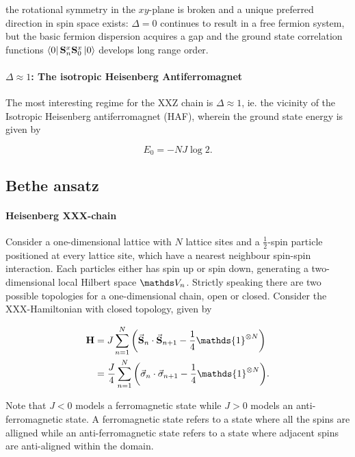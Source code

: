 \documentclass{homework}
\begin{document}
the rotational symmetry in the $xy$-plane is broken and a unique preferred direction in spin space exists: $\Delta = 0$ continues to result in a free fermion system, but the basic fermion dispersion acquires a gap and the ground state correlation functions $\bra{0}{{\bf S}}_n^x{{\bf S}}_0^x\ket{0}$
develops long range order. \\

\paragraph{\textbf{$\Delta \approx 1$: The isotropic Heisenberg Antiferromagnet}}

The most interesting regime for the XXZ chain is $\Delta \approx 1$, ie. the vicinity of the Isotropic Heisenberg antiferromagnet (HAF), wherein the ground state energy is given by 

$$
    E_0 = - N J \log 2.
$$

\clearpage

\subsection{Bethe ansatz}

\paragraph{\textbf{Heisenberg XXX-chain}}

Consider a one-dimensional lattice with $N$ lattice sites and a $\frac{1}{2}$-spin particle positioned at every lattice site, which have a nearest neighbour spin-spin interaction. Each particles either has spin up or spin down, generating a two-dimensional local Hilbert space $\vds_n$. Strictly speaking there are two possible topologies for a one-dimensional chain, open or closed. Consider the XXX-Hamiltonian with closed topology, given by 

\begin{equation}
\begin{split}
    {\bf H} &= J \sum_{n=1}^{N} \bigg(\vec{\spin}_n \cdot \vec{\spin}_{n+1} - \frac{1}{4} \mathds{1}^{\otimes N} \bigg) \\
    &= \frac{J}{4}\sum_{n=1}^{N} \bigg(\vec{\sigma}_n \cdot \vec{\sigma}_{n+1} - \frac{1}{4} \mathds{1}^{\otimes N} \bigg).
    \label{XXX model}
\end{split}
\end{equation}

Note that $J < 0$ models a ferromagnetic state while $J > 0$ models an anti-ferromagnetic state. A ferromagnetic state refers to a state where all the spins are alligned while an anti-ferromagnetic state refers to a state where adjacent spins are anti-aligned within the domain. 
\end{document}
